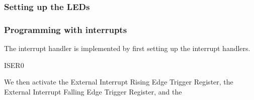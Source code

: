 \subsubsection{Setting up the LEDs}
\label{subsubsec:dev_pros_setup_led}

\subsubsection{Programming with interrupts}
\label{subsubsec:dev_pros_interrupts}
The interrupt handler is implemented by first setting up the interrupt handlers.

ISER0

We then activate the External Interrupt Rising Edge Trigger Register, the External Interrupt Falling Edge Trigger Register, and the 

